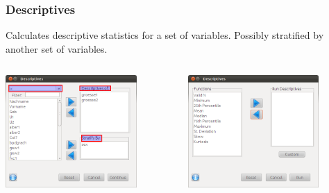 \documentclass[xcolor={table}]{beamer}
\begin{document}
\begin{frame}\frametitle{Descriptives}
Calculates descriptive statistics for a set of variables. Possibly stratified by another set of variables. 
\begin{columns}
\begin{column}{0.5\textwidth}
\includegraphics[width=5cm]{descr1.png}
\end{column}
\begin{column}{0.5\textwidth}
\includegraphics[width=5cm]{descr2.png}
\end{column}
\end{columns}
\end{frame}
\end{document}
